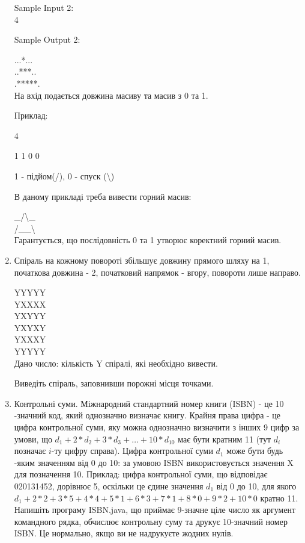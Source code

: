 \documentclass[]{article}
\begin{document}
\begin{enumerate}
Sample Input 2:\\

4

Sample Output 2:

...*...\\
..***..\\
.*****.\\


На вхід подається довжина масиву та масив з 0 та 1.

Приклад:

4

1 1 0 0

1  - підйом(\slash), 0 - спуск (\textbackslash)

В даному прикладі треба вивести горний масив:

\_\slash \textbackslash\_ \\
\slash\_\_\textbackslash\\

Гарантується, що послідовність 0 та 1 утворює коректний горний масив.
\item
Спіраль на кожному повороті збільшує довжину прямого шляху на 1, початкова довжина - 2,
початковий напрямок - вгору, повороти лише направо.

YYYYY\\
YXXXX\\
YXYYY\\
YXYXY\\
YXXXY\\
YYYYY\\
Дано число: кількість Y спіралі, які необхідно вивести.

Виведіть спіраль, заповнивши порожні місця точками.


\item Контрольні суми.
Міжнародний стандартний номер книги (ISBN) - це 10 -значний код, який однозначно визначає книгу.
Крайня права цифра - це цифра контрольної суми, яку можна однозначно визначити з інших 9 цифр за умови,
що $d_{1} + 2*d_{2} + 3*d_{3} + \ldots + 10*d_{10}$ має бути кратним 11 (тут $d_{i}$ позначає $i$-ту цифру справа).
 Цифра контрольної суми $d_1$ може бути будь -яким значенням від 0 до 10:
за умовою ISBN використовується значення X для позначення 10.
Приклад: цифра контрольної суми, що відповідає 020131452, дорівнює 5, оскільки це єдине значення $d_1$ від 0 до 10,
для якого $d_1 + 2*2 + 3*5 + 4*4 + 5*1 + 6*3 + 7*1 + 8*0 + 9*2 + 10*0$ кратно 11.
 Напишіть програму ISBN.java, що приймає 9-значне ціле число як аргумент командного рядка, обчислює контрольну суму та
 друкує 10-значний номер ISBN. Це нормально, якщо ви не надрукуєте жодних нулів.


\end{enumerate}
\end{document}
